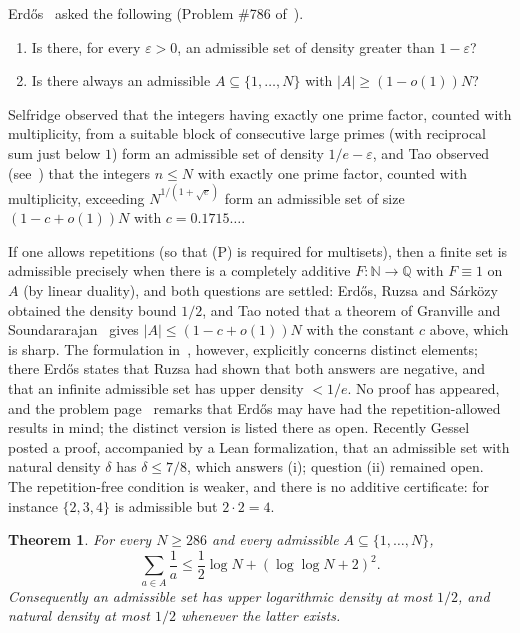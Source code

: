 \documentclass[11pt]{amsart}
\newtheorem{theorem}{Theorem}
\theoremstyle{definition}
\theoremstyle{remark}
\newcommand{\N}{\mathbb{N}}
\newcommand{\Q}{\mathbb{Q}}
\newcommand{\abs}[1]{\lvert #1\rvert}
\begin{document}
Erd\H{o}s~\cite{Er65,Er80} asked the following (Problem \#786 of~\cite{EP}).
\begin{enumerate}[label=(\roman*)]
\item Is there, for every $\varepsilon>0$, an admissible set of density greater than $1-\varepsilon$?
\item Is there always an admissible $A\subseteq\{1,\dots,N\}$ with $\abs{A}\ge(1-o(1))N$?
\end{enumerate}
Selfridge observed that the integers having exactly one prime factor, counted with multiplicity, from a suitable block of consecutive large primes (with reciprocal sum just below $1$) form an admissible set of density $1/e-\varepsilon$, and Tao observed (see~\cite{EP}) that the integers $n\le N$ with exactly one prime factor, counted with multiplicity, exceeding $N^{1/(1+\sqrt e)}$ form an admissible set of size $(1-c+o(1))N$ with $c=0.1715\ldots$.

If one allows repetitions (so that (P) is required for multisets), then a finite set is admissible precisely when there is a completely additive $F:\N\to\Q$ with $F\equiv1$ on $A$ (by linear duality), and both questions are settled: Erd\H{o}s, Ruzsa and S\'ark\"ozy~\cite{ERS73} obtained the density bound $1/2$, and Tao noted that a theorem of Granville and Soundararajan~\cite{GS01} gives $\abs{A}\le(1-c+o(1))N$ with the constant $c$ above, which is sharp. The formulation in~\cite[p.~114]{Er80}, however, explicitly concerns distinct elements; there Erd\H{o}s states that Ruzsa had shown that both answers are negative, and that an infinite admissible set has upper density $<1/e$. No proof has appeared, and the problem page~\cite{EP} remarks that Erd\H{o}s may have had the repetition-allowed results in mind; the distinct version is listed there as open. Recently Gessel~\cite{Gessel} posted a proof, accompanied by a Lean formalization, that an admissible set with natural density $\delta$ has $\delta\le7/8$, which answers (i); question (ii) remained open. The repetition-free condition is weaker, and there is no additive certificate: for instance $\{2,3,4\}$ is admissible but $2\cdot2=4$.

\begin{theorem}\label{thm:log}
For every $N\ge286$ and every admissible $A\subseteq\{1,\dots,N\}$,
\[
\sum_{a\in A}\frac1a\le\frac12\log N+(\log\log N+2)^2 .
\]
Consequently an admissible set has upper logarithmic density at most $1/2$, and natural density at most $1/2$ whenever the latter exists.
\end{theorem}
\end{document}
